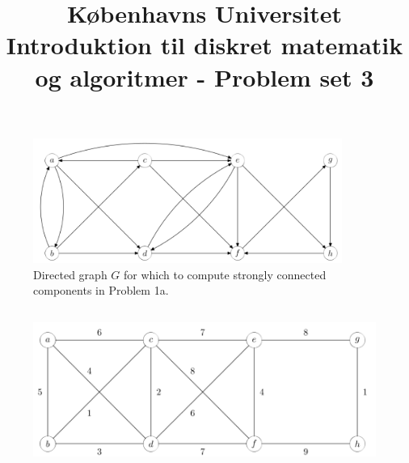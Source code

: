 \documentclass[a4paper,12pt]{article}
\begin{document}
% 

\title{Københavns Universitet\\
Introduktion til diskret matematik og algoritmer - Problem set 3}
\maketitle %



\section[Question 1]{}

\subsection[]{}



\begin{figure}[H]
    \centering
    \includegraphics[width=0.9\textwidth]{1.png}
    \caption{Directed graph $G$ for which to compute strongly connected components in Problem 1a.}
\end{figure}



\subsection[]{}



\begin{figure}[H]
    \centering
    \includegraphics[width=1\textwidth]{2.png}
    \caption{}
\end{figure}
\end{document}
